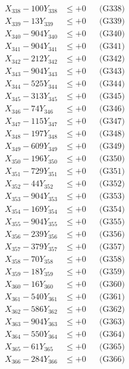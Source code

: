 \documentclass[a4paper,10pt]{article}
\begin{document}
{\begin{align}
X_{338} - 100Y_{338} &\leq +0 && \text{(G338)} \\
X_{339} - 13Y_{339} &\leq +0 && \text{(G339)} \\
X_{340} - 904Y_{340} &\leq +0 && \text{(G340)} \\
\allowbreak
X_{341} - 904Y_{341} &\leq +0 && \text{(G341)} \\
X_{342} - 212Y_{342} &\leq +0 && \text{(G342)} \\
X_{343} - 904Y_{343} &\leq +0 && \text{(G343)} \\
X_{344} - 525Y_{344} &\leq +0 && \text{(G344)} \\
X_{345} - 313Y_{345} &\leq +0 && \text{(G345)} \\
X_{346} - 74Y_{346} &\leq +0 && \text{(G346)} \\
X_{347} - 115Y_{347} &\leq +0 && \text{(G347)} \\
X_{348} - 197Y_{348} &\leq +0 && \text{(G348)} \\
X_{349} - 609Y_{349} &\leq +0 && \text{(G349)} \\
X_{350} - 196Y_{350} &\leq +0 && \text{(G350)} \\
\allowbreak
X_{351} - 729Y_{351} &\leq +0 && \text{(G351)} \\
X_{352} - 44Y_{352} &\leq +0 && \text{(G352)} \\
X_{353} - 904Y_{353} &\leq +0 && \text{(G353)} \\
X_{354} - 169Y_{354} &\leq +0 && \text{(G354)} \\
X_{355} - 904Y_{355} &\leq +0 && \text{(G355)} \\
X_{356} - 239Y_{356} &\leq +0 && \text{(G356)} \\
X_{357} - 379Y_{357} &\leq +0 && \text{(G357)} \\
X_{358} - 70Y_{358} &\leq +0 && \text{(G358)} \\
X_{359} - 18Y_{359} &\leq +0 && \text{(G359)} \\
X_{360} - 16Y_{360} &\leq +0 && \text{(G360)} \\
\allowbreak
X_{361} - 540Y_{361} &\leq +0 && \text{(G361)} \\
X_{362} - 586Y_{362} &\leq +0 && \text{(G362)} \\
X_{363} - 904Y_{363} &\leq +0 && \text{(G363)} \\
X_{364} - 550Y_{364} &\leq +0 && \text{(G364)} \\
X_{365} - 61Y_{365} &\leq +0 && \text{(G365)} \\
X_{366} - 284Y_{366} &\leq +0 && \text{(G366)} \\

\end{align}}
\end{document}
